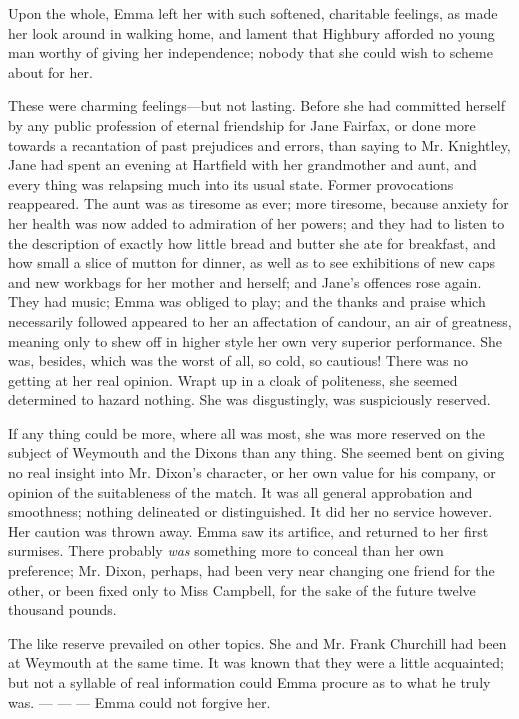 Upon the whole, Emma left her with such softened, charitable feelings, as made her look around in walking home, and lament that Highbury afforded no young man worthy of giving her independence; nobody that she could wish to scheme about for her.

These were charming feelings---but not lasting. Before she had committed herself by any public profession of eternal friendship for Jane Fairfax, or done more towards a recantation of past prejudices and errors, than saying to Mr. Knightley,  Jane had spent an evening at Hartfield with her grandmother and aunt, and every thing was relapsing much into its usual state. Former provocations reappeared. The aunt was as tiresome as ever; more tiresome, because anxiety for her health was now added to admiration of her powers; and they had to listen to the description of exactly how little bread and butter she ate for breakfast, and how small a slice of mutton for dinner, as well as to see exhibitions of new caps and new workbags for her mother and herself; and Jane's offences rose again. They had music; Emma was obliged to play; and the thanks and praise which necessarily followed appeared to her an affectation of candour, an air of greatness, meaning only to shew off in higher style her own very superior performance. She was, besides, which was the worst of all, so cold, so cautious! There was no getting at her real opinion. Wrapt up in a cloak of politeness, she seemed determined to hazard nothing. She was disgustingly, was suspiciously reserved.

If any thing could be more, where all was most, she was more reserved on the subject of Weymouth and the Dixons than any thing. She seemed bent on giving no real insight into Mr. Dixon's character, or her own value for his company, or opinion of the suitableness of the match. It was all general approbation and smoothness; nothing delineated or distinguished. It did her no service however. Her caution was thrown away. Emma saw its artifice, and returned to her first surmises. There probably {\em was} something more to conceal than her own preference; Mr. Dixon, perhaps, had been very near changing one friend for the other, or been fixed only to Miss Campbell, for the sake of the future twelve thousand pounds.

The like reserve prevailed on other topics. She and Mr. Frank Churchill had been at Weymouth at the same time. It was known that they were a little acquainted; but not a syllable of real information could Emma procure as to what he truly was. --- --- --- Emma could not forgive her.

